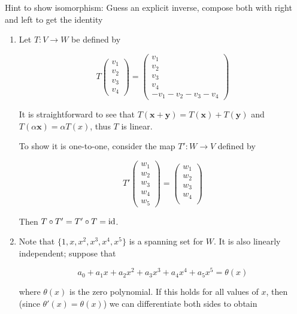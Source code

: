 \documentclass[a4paper]{article}
\begin{document}
	Hint to show isomorphism: Guess an explicit inverse, compose both with right and left to get the identity
	
	\begin{enumerate}[label = (\alph*)]
		\item Let $ T : V \to W $ be defined by
		
		\[ T \begin{pmatrix}
		v_{1}\\
		v_{2}\\
		v_{3}\\
		v_{4}
		\end{pmatrix}  = \begin{pmatrix}
		v_{1}\\
		v_{2}\\
		v_{3}\\
		v_{4} \\
		-v_{1} - v_{2} - v_{3} - v_{4}
		\end{pmatrix}\]
		
		It is straightforward to see that $ T(\mathbf{x} + \mathbf{y}) = T(\mathbf{x}) + T(\mathbf{y}) $ and $ T(\alpha \mathbf{x} ) = \alpha T(x) $, thus $ T $ is linear.	
		
		To show it is one-to-one, consider the map $ T': W \to V $ defined by
		
		\[ T' \begin{pmatrix}
		w_{1}\\
		w_{2}\\
		w_{3}\\
		w_{4}\\
		w_{5}
		\end{pmatrix}  = \begin{pmatrix}
		w_{1}\\
		w_{2}\\
		w_{3}\\
		w_{4} \\
		\end{pmatrix} \]	
		
		Then $ T \circ T' = T' \circ T = \operatorname{id} $.
		
		\item Note that $ \{1,x,x^{2},x^{3},x^{4},x^{5}\} $ is a spanning set for $ W $. It is also linearly independent; suppose that
		
		\[ a_{0} + a_{1} x + a_{2} x^{2} + a_{3}x^{3} + a_{4}x^{4} + a_{5}x^{5} = \theta(x) \]
		
		where $ \theta(x) $ is the zero polynomial. If this holds for all values of $ x $, then (since $ \theta'(x) = \theta(x) $) we can differentiate both sides to obtain 
		

\end{enumerate}
\end{document}

